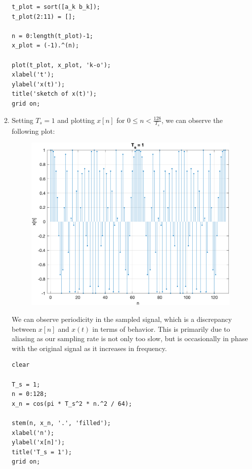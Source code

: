 \documentclass[12pt]{article}
\begin{document}
\begin{enumerate}[label=\textbf{\alph*)}, leftmargin=2.6em]
\begin{verbatim}
t_plot = sort([a_k b_k]);
t_plot(2:11) = [];

n = 0:length(t_plot)-1;
x_plot = (-1).^(n);

plot(t_plot, x_plot, 'k-o');
xlabel('t');
ylabel('x(t)');
title('sketch of x(t)');
grid on;
\end{verbatim}

\item Setting $T_s=1$ and plotting $x[n]$ for $0\le n<\frac{128}{T_s}$, we can observe the following plot:
\begin{figure} [H]
    \centering
    \includegraphics[width=0.5\linewidth]{2c.png}
\end{figure}
We can observe periodicity in the sampled signal, which is a discrepancy between $x[n]$ and $x(t)$ in terms of behavior. This is primarily due to aliasing as our sampling rate is not only too slow, but is occasionally in phase with the original signal as it increases in frequency.

\begin{verbatim}
clear

T_s = 1;
n = 0:128;
x_n = cos(pi * T_s^2 * n.^2 / 64);

stem(n, x_n, '.', 'filled');
xlabel('n');
ylabel('x[n]');
title('T_s = 1');
grid on;
\end{verbatim}


\end{enumerate}
\end{document}
